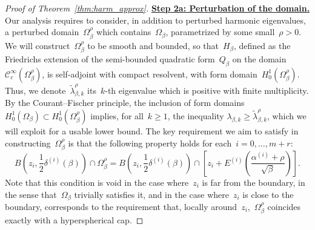 \documentclass[10pt]{article}
\newcommand{\1}{\mathbbm 1}
\newcommand{\epsLimit}[1]{\alpha^{(#1)}} %
\newcommand{\halfSpace}[1]{E^{(#1)}}
\newcommand{\shift}{\rho} %
\begin{document}
\begin{proof}[Proof of Theorem~\ref{thm:harm_approx}]
        {\underline{\bf Step 2a: Perturbation of the domain.}\newline}
        Our analysis requires to consider, in addition to perturbed harmonic eigenvalues, a perturbed domain~$\Omega_\beta^\shift$ which contains~$\Omega_\beta$, parametrized by some small~$\shift>0$.
        We will construct~$\Omega_\beta^\shift$ to be smooth and bounded, so that~$H_\beta$, defined as the Friedrichs extension of the semi-bounded quadratic form~$Q_\beta$ on the domain~$\mathcal C_c^\infty( \Omega_\beta^\shift)$, is self-adjoint with compact resolvent, with form domain~$H_0^1(\Omega_\beta^\shift)$.
        Thus, we denote~$\widetilde \lambda^\shift_{\beta,k}$ its~$k$-th eigenvalue which is positive with finite multiplicity.
        By the Courant--Fischer principle, the inclusion of form domains
        $H_0^1(\Omega_\beta) \subset H_0^1(\Omega_\beta^\shift)$
        implies, for all~$k\geq 1$, the inequality
        $\lambda_{\beta,k}\geq \widetilde\lambda^\shift_{\beta,k}$, which we will exploit for a usable lower bound.
        The key requirement we aim to satisfy in constructing~$\Omega_\beta^\shift$ is that the following property holds for each~$i=0,\dots,m+r$:
        \begin{equation}
            \label{eq:inclusion_perturbed_domain}
            B\left(z_i,\frac12\delta^{(i)}(\beta)\right) \cap \Omega_\beta^\shift = B\left(z_i,\frac12\delta^{(i)}(\beta)\right) \cap \left[z_i + \halfSpace{i}\left(\frac{\epsLimit{i}+\shift}{\sqrt\beta}\right)\right].
        \end{equation}
        Note that this condition is void in the case where~$z_i$ is far from the boundary, in the sense that~$\Omega_\beta$ trivially satisfies it, and in the case where~$z_i$ is close to the boundary, corresponds to the requirement that, locally around~$z_i$,~$\Omega_\beta^\shift$ coincides exactly with a hyperspherical cap.


\end{proof}
\end{document}
